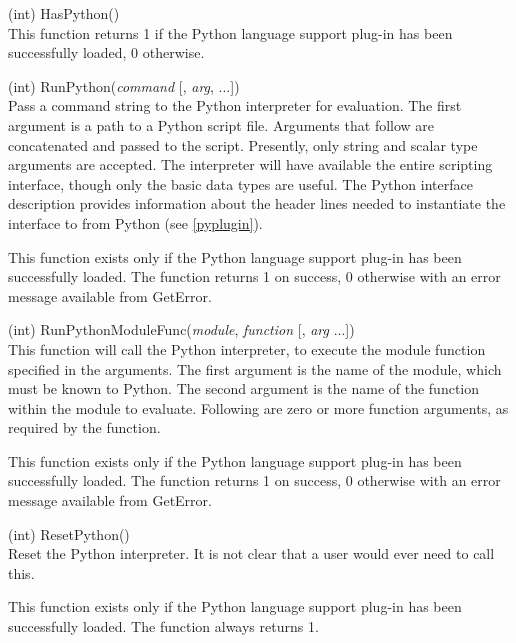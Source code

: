 \begin{description}
\item{(int) \vt HasPython()}\\
This function returns 1 if the Python language support plug-in has
been successfully loaded, 0 otherwise.

\item{(int) \vt RunPython({\it command\/} [, {\it arg\/}, ...])}\\
Pass a command string to the Python interpreter for evaluation.  The
first argument is a path to a Python script file.  Arguments that
follow are concatenated and passed to the script.  Presently, only
string and scalar type arguments are accepted.  The interpreter will
have available the entire {\Xic} scripting interface, though only the
basic data types are useful.  The Python interface description
provides information about the header lines needed to instantiate the
interface to {\Xic} from Python (see \ref{pyplugin}).

This function exists only if the Python language support plug-in has
been successfully loaded.  The function returns 1 on success, 0
otherwise with an error message available from {\vt GetError}.

\item{(int) \vt RunPythonModuleFunc({\it module\/}, {\it function\/}
 [, {\it arg} ...])}\\
This function will call the Python interpreter, to execute the module
function specified in the arguments.  The first argument is the name
of the module, which must be known to Python.  The second argument is
the name of the function within the module to evaluate.  Following are
zero or more function arguments, as required by the function.

This function exists only if the Python language support plug-in has
been successfully loaded.  The function returns 1 on success, 0
otherwise with an error message available from {\vt GetError}.

\item{(int) \vt ResetPython()}\\
Reset the Python interpreter.  It is not clear that a user would ever
need to call this.

This function exists only if the Python language support plug-in has
been successfully loaded.  The function always returns 1.


\end{description}
